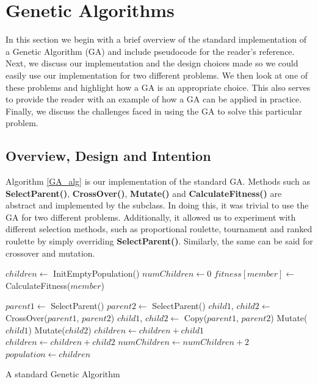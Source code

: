 \section{Genetic Algorithms}
In this section we begin with a brief overview of the standard implementation of a Genetic Algorithm (GA) and include
pseudocode for the reader's reference. Next, we discuss our implementation and the design choices made so we could easily
use our implementation for two different problems. We then look at one of these problems and highlight how a GA is an
appropriate choice. This also serves to provide the reader with an example of how a GA can be applied in practice.
Finally, we discuss the challenges faced in using the GA to solve this particular problem.


\subsection{Overview, Design and Intention}
Algorithm \ref{GA_alg} is our implementation of the standard GA. Methods such as \textbf{SelectParent()}, \textbf{CrossOver()}, \textbf{Mutate()} and \textbf{CalculateFitness()} are abstract and implemented by the subclass.
In doing this, it was trivial to use the GA for two different problems. Additionally, it allowed us to experiment with 
different selection methods, such as proportional roulette, tournament and ranked roulette by simply 
overriding \textbf{SelectParent()}. Similarly, the same can be said for crossover and mutation.
\begin{algorithm}[h]
\begin{algorithmic}
\State $children \gets$ InitEmptyPopulation()
\State $numChildren \gets 0$ 
	\State $fitness[member] \gets$ CalculateFitness($member$)
\EndFor

	\State $parent1 \gets$ SelectParent()
	\State $parent2 \gets$ SelectParent()
		\State $child1$, $child2 \gets $ CrossOver($parent1$, $parent2$)
	\Else
		\State $child1$, $child2 \gets $ Copy($parent1$, $parent2$)
	\EndIf
	\State Mutate($child1$) 
	\State Mutate($child2$) 
	\State $children \gets children + child1$
	\State $children \gets children + child2$
	\State $numChildren \gets numChildren + 2$
\EndWhile
\State $population \gets children$ 
\caption{A standard Genetic Algorithm}
\label{GA_alg}
\end{algorithmic}
\end{algorithm}

